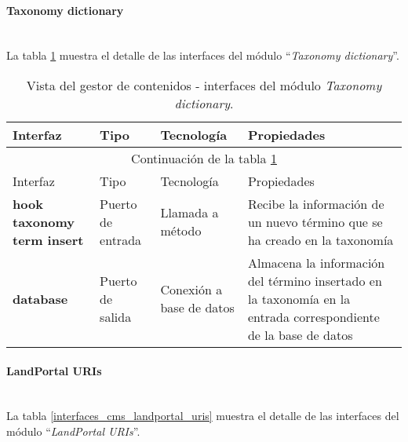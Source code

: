 \paragraph{Taxonomy dictionary} \hfill \\
La tabla \ref{interfaces_cms_taxonomy_dictionary} muestra el detalle de las interfaces del módulo ``\textit{Taxonomy dictionary}''.  

\begin{longtable}[c]{|p{25mm}|p{20mm}|p{30mm}|p{60mm}|}
	\caption{Vista del gestor de contenidos - interfaces del módulo \textit{Taxonomy dictionary}. \label{interfaces_cms_taxonomy_dictionary}}\\
		\hline
			Interfaz & Tipo & Tecnología & Propiedades\\
		\hline
		\hline
	\endfirsthead
		\hline
		\multicolumn{4}{|c|}{Continuación de la tabla \ref{interfaces_cms_taxonomy_dictionary}}\\
		\hline
			Interfaz & Tipo & Tecnología & Propiedades\\
		\hline
		\hline
	\endhead
	\hline
	\endfoot
		\textbf{hook taxonomy term insert} & Puerto de entrada & Llamada a método & Recibe la información de un nuevo término que se ha creado en la taxonomía \\
		\hline
		\textbf{database} & Puerto de salida & Conexión a base de datos & Almacena la información del término insertado en la taxonomía en la entrada correspondiente de la base de datos \\
	\hline
	\hline
\end{longtable}


\paragraph{LandPortal URIs} \hfill \\
La tabla \ref{interfaces_cms_landportal_uris} muestra el detalle de las interfaces del módulo ``\textit{LandPortal URIs}''.  

